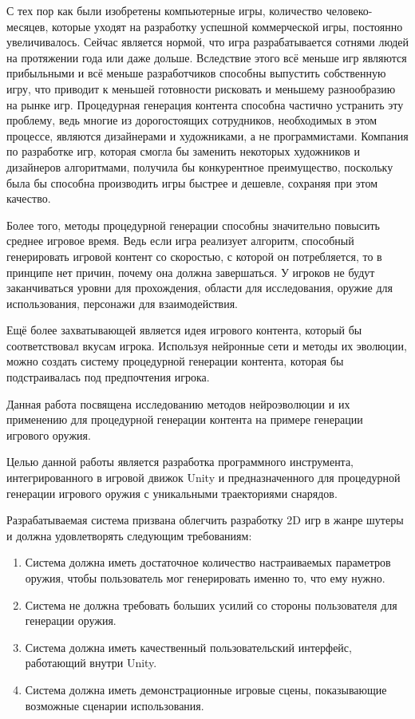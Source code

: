 ﻿%

С тех пор как были изобретены компьютерные игры, количество человеко-месяцев, которые уходят на разработку успешной коммерческой игры, постоянно увеличивалось. Сейчас является нормой, что игра разрабатывается сотнями людей на протяжении года или даже дольше. Вследствие этого всё меньше игр являются прибыльными и всё меньше разработчиков способны выпустить собственную игру, что приводит к меньшей готовности рисковать и меньшему разнообразию на рынке игр. Процедурная генерация контента способна частично устранить эту проблему, ведь многие из дорогостоящих сотрудников, необходимых в этом процессе, являются дизайнерами и художниками, а не программистами. Компания по разработке игр, которая смогла бы заменить некоторых художников и дизайнеров алгоритмами, получила бы конкурентное преимущество, поскольку была бы способна производить игры быстрее и дешевле, сохраняя при этом качество.

Более того, методы процедурной генерации способны значительно повысить среднее игровое время. Ведь если игра реализует алгоритм, способный генерировать игровой контент со скоростью, с которой он потребляется, то в принципе нет причин, почему она должна завершаться. У игроков не будут заканчиваться уровни для прохождения, области для исследования, оружие для использования, персонажи для взаимодействия.

Ещё более захватывающей является идея игрового контента, который бы соответствовал вкусам игрока. Используя нейронные сети и методы их эволюции, можно создать систему процедурной генерации контента, которая бы подстраивалась под предпочтения игрока.

Данная работа посвящена исследованию методов нейроэволюции и их применению для процедурной генерации контента на примере генерации игрового оружия.

\pagebreak


Целью данной работы является разработка программного инструмента, интегрированного в игровой движок Unity и предназначенного для процедурной генерации игрового оружия с уникальными траекториями снарядов.

Разрабатываемая система призвана облегчить разработку 2D игр в жанре шутеры и должна удовлетворять следующим требованиям:
\begin{enumerate}
    \item Система должна иметь достаточное количество настраиваемых параметров оружия, чтобы пользователь мог генерировать именно то, что ему нужно.
    \item Система не должна требовать больших усилий со стороны пользователя для генерации оружия.
    \item Система должна иметь качественный пользовательский интерфейс, работающий внутри Unity.
    \item Система должна иметь демонстрационные игровые сцены, показывающие возможные сценарии использования.
\end{enumerate}

